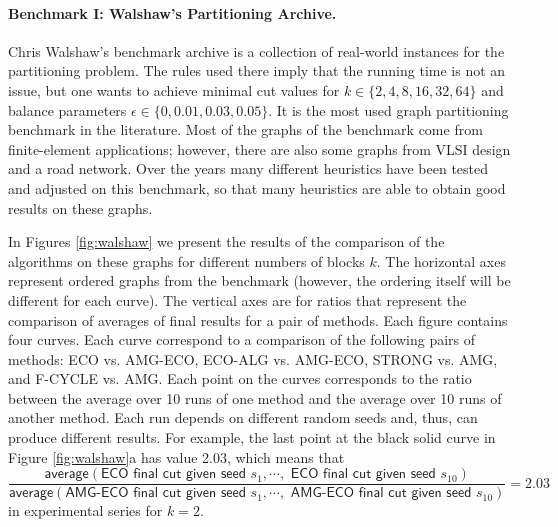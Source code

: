 \documentclass{llncs}
\begin{document}
\paragraph{Benchmark I: Walshaw's Partitioning Archive.} Chris Walshaw's benchmark archive \cite{soper2004combined} is a collection of real-world instances for the partitioning problem. The rules used there imply that the running time is not an issue, but one wants to achieve minimal cut values for $k \in \{2,4,8,16,32,64\}$ and balance parameters $\epsilon \in \{0,0.01,0.03,0.05\}$. It is the most used graph partitioning benchmark in the literature. 
Most of the graphs of the benchmark come from finite-element applications; however, there are also some graphs from VLSI design and a road network. Over the years many different heuristics have been tested and adjusted on this benchmark, so that many heuristics are able to obtain good results on these graphs.
\par In Figures \ref{fig:walshaw} we present the results of the comparison of the algorithms on these graphs for different numbers of blocks $k$. 
The horizontal axes represent ordered graphs from the benchmark (however, the ordering itself will be different for each curve). 
The vertical axes are for ratios that represent the comparison of averages of final results for a pair of methods. Each figure contains four curves.
Each curve correspond to a comparison of the following pairs of methods: 
 ECO vs. AMG-ECO, ECO-ALG vs. AMG-ECO, STRONG vs. AMG, and F-CYCLE vs. AMG. Each point on the curves corresponds to the ratio between the average over 10 runs of one method and the average over 10 runs of another method. Each run depends on different random seeds and, thus, can produce different results. For example, the last point at the black solid curve in Figure \ref{fig:walshaw}a has value 2.03, which means that
\[
\frac{\textsf{average}(\textsf{ECO final cut given seed } s_1, \cdots,  \textsf{ ECO final cut given seed } s_{10})}{\textsf{average}(\textsf{AMG-ECO final cut given seed } s_1, \cdots,  \textsf{ AMG-ECO final cut given seed } s_{10})} = 2.03
\]
in experimental series for $k=2$.
\end{document}
